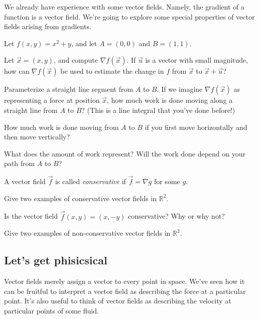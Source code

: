 \documentclass{problemset}
\newcommand{\R}{\mathbb{R}}
\begin{document}
	We already have experience with some vector fields.  Namely, the gradient of a function is a vector field.
	We're going to explore some special properties of vector fields arising from gradients.
	
	\question
	Let $f(x,y) = x^2+y$, and let $A=(0,0)$ and $B=(1,1)$.
	\begin{parts}
		\item Let $\vec x=(x,y)$, and compute $\nabla f(\vec x)$.   
			If $\vec u$ is a vector with small
			magnitude, how can $\nabla f(\vec x)$ be used to
			estimate the change in $f$ from $\vec x$ to $\vec x+\vec u$?
		\item Parameterize a straight line segment from $A$ to $B$.  If we imagine
			$\nabla f(\vec x)$ as representing a force at position $\vec x$,
			how much work is done moving along a straight line
			from $A$ to $B$?  (This is a line integral that you've done
			before!)
		\item How much work is done moving from $A$ to $B$ if you first move
			horizontally and then move vertically?
		\item What does the amount of work represent?  Will the work done
			depend on your path from $A$ to $B$?

	\end{parts}

	\begin{definition}[Conservative]
		A vector field $\vec f$ is called \emph{conservative} if $\vec f=\nabla g$ for some $g$.
	\end{definition}

	\question
	\begin{parts}
		\item Give two examples of conservative vector fields in $\R^2$.
		\item Is the vector field $\vec f(x,y) = (x,-y)$ conservative?
			Why or why not?
		\item Give two examples of non-conservative vector fields in $\R^2$.
	\end{parts}

\subsection*{Let's get phisicsical}
	Vector fields merely assign a vector to every point in space.  We've
	seen how it can be fruitful to interpret a vector field as describing
	the force at a particular point.  It's also useful to think of vector
	fields as describing the velocity at particular points of some fluid.
\end{document}
